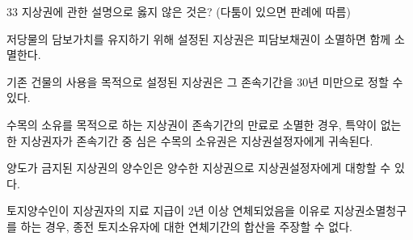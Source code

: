 \begin{question}{33}
지상권에 관한 설명으로 옳지 않은 것은? (다툼이 있으면 판례에 따름)
\begin{choices}
  \item 저당물의 담보가치를 유지하기 위해 설정된 지상권은 피담보채권이 소멸하면 함께 소멸한다.
  \item 기존 건물의 사용을 목적으로 설정된 지상권은 그 존속기간을 30년 미만으로 정할 수 있다.
  \item 수목의 소유를 목적으로 하는 지상권이 존속기간의 만료로 소멸한 경우, 특약이 없는 한 지상권자가 존속기간 중 심은 수목의 소유권은 지상권설정자에게 귀속된다.
  \item 양도가 금지된 지상권의 양수인은 양수한 지상권으로 지상권설정자에게 대항할 수 있다.
  \item 토지양수인이 지상권자의 지료 지급이 2년 이상 연체되었음을 이유로 지상권소멸청구를 하는 경우, 종전 토지소유자에 대한 연체기간의 합산을 주장할 수 없다.
\end{choices}
\end{question}
